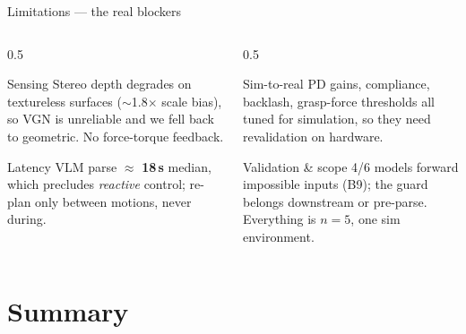 \documentclass[aspectratio=169,11pt]{beamer}
\begin{document}
\begin{frame}{Limitations --- the real blockers}
	\begin{columns}[t]
		\begin{column}{0.5\textwidth}
			\begin{block}{Sensing}
				\footnotesize Stereo depth degrades on textureless surfaces ($\sim$1.8$\times$ scale bias),
				so VGN is unreliable and we fell back to geometric. No force-torque feedback.
			\end{block}
			\begin{block}{Latency}
				\footnotesize VLM parse $\approx$ \textbf{18\,s} median, which precludes \emph{reactive} control;
				re-plan only between motions, never during.
			\end{block}
		\end{column}
		\begin{column}{0.5\textwidth}
			\begin{block}{Sim-to-real}
				\footnotesize PD gains, compliance, backlash, grasp-force thresholds all tuned for
				simulation, so they need revalidation on hardware.
			\end{block}
			\begin{block}{Validation \& scope}
				\footnotesize 4/6 models forward impossible inputs (B9); the guard belongs downstream
				or pre-parse. Everything is $n=5$, one sim environment.
			\end{block}
		\end{column}
	\end{columns}
\end{frame}

\section{Summary}
\end{document}
